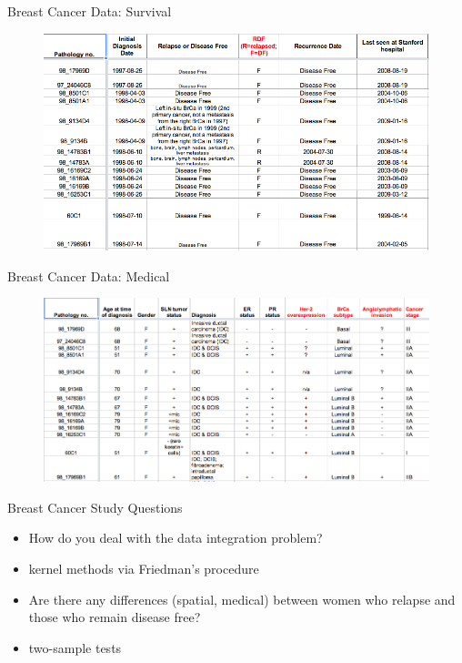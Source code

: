 \documentclass{beamer}
\begin{document}
\begin{frame}{Breast Cancer Data: Survival}
  \begin{figure}
    \centering
    \includegraphics[scale=.5]{survival.png}
  \end{figure}
\end{frame}

\begin{frame}{Breast Cancer Data: Medical}
  \begin{figure}
    \centering
    \includegraphics[scale=.5]{medical.png}
  \end{figure}
\end{frame}

\begin{frame}{Breast Cancer Study Questions}
  \begin{itemize}
  \item How do you deal with the data integration problem? \pause
  \item kernel methods via Friedman's procedure \pause
  \item Are there any differences (spatial, medical) between women who
    relapse and those who remain disease free? \pause
  \item two-sample tests
  \end{itemize}
\end{frame}
\end{document}

